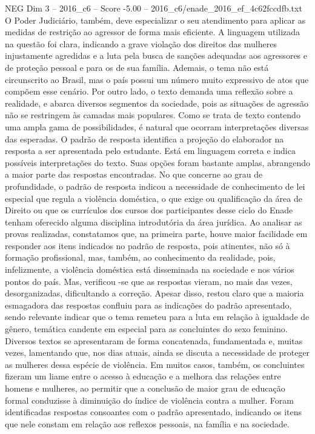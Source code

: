 \begin{textsample}{NEG Dim 3 – 2016\_c6 – Score -5.00 – 2016\_c6/enade\_2016\_ef\_4c62fccdfb.txt}
O Poder Judiciário, também, deve especializar o seu atendimento para aplicar as medidas de restrição ao agressor de forma mais eficiente.
A linguagem utilizada na questão foi clara, indicando a grave violação dos direitos das mulheres injustamente agredidas e a luta pela busca de sanções adequadas aos agressores e de proteção pessoal e para os de sua família.
Ademais, o tema não está circunscrito ao Brasil, mas o país possui um número muito expressivo de atos que compõem esse cenário.
Por outro lado, o texto demanda uma reflexão sobre a realidade, e abarca diversos segmentos da sociedade, pois as situações de agressão não se restringem às camadas mais populares.
Como se trata de texto contendo uma ampla gama de possibilidades, é natural que ocorram interpretações diversas das esperadas.
O padrão de resposta identifica a projeção do elaborador na resposta a ser apresentada pelo estudante.
Está em linguagem correta e indica possíveis interpretações do texto.
Suas opções foram bastante amplas, abrangendo a maior parte das respostas encontradas.
No que concerne ao grau de profundidade, o padrão de resposta indicou a necessidade de conhecimento de lei especial que regula a violência doméstica, o que exige ou qualificação da área de Direito ou que os currículos dos cursos dos participantes desse ciclo do Enade tenham oferecido alguma disciplina introdutória da área jurídica.
Ao analisar as provas realizadas, constatamos que, na primeira parte, houve maior facilidade em responder aos itens indicados no padrão de resposta, pois atinentes, não só à formação profissional, mas, também, ao conhecimento da realidade, pois, infelizmente, a violência doméstica está disseminada na sociedade e nos vários pontos do país.
Mas, verificou -se que as respostas vieram, no mais das vezes, desorganizadas, dificultando a correção.
Apesar disso, restou claro que a maioria esmagadora das respostas confluiu para as indicações do padrão apresentado, sendo relevante indicar que o tema remeteu para a luta em relação à igualdade de gênero, temática candente em especial para as concluintes do sexo feminino.
Diversos textos se apresentaram de forma concatenada, fundamentada e, muitas vezes, lamentando que, nos dias atuais, ainda se discuta a necessidade de proteger as mulheres dessa espécie de violência.
Em muitos casos, também, os concluintes fizeram um liame entre o acesso à educação e a melhora das relações entre homens e mulheres, ao permitir que a conclusão de maior grau de educação formal conduzisse à diminuição do índice de violência contra a mulher.
Foram identificadas respostas consoantes com o padrão apresentado, indicando os itens que nele constam em relação aos reflexos pessoais, na família e na sociedade.

\end{textsample}
